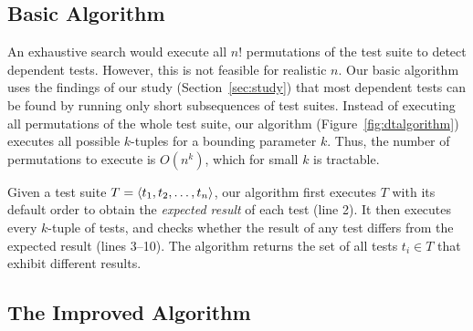 \subsection{Basic Algorithm}
\label{sec:basic}

An exhaustive search would execute all $n!$
permutations of the test suite to detect dependent tests.
However, this is not feasible for realistic $n$.
Our basic algorithm uses the findings of our study
(Section~\ref{sec:study})
that most dependent tests can be found by running only short
subsequences of test suites. 
Instead of executing all permutations of the
whole test suite, our algorithm (Figure~\ref{fig:dtalgorithm})
executes all possible $k$-tuples for a bounding
parameter $k$.
Thus, the number of permutations to execute
is $O(n^k)$, which for small $k$ is tractable. 


Given a test suite $T =  \langle t_1, t_2, \ldots, t_n \rangle $, our algorithm
first executes $T$ with its default order
to obtain the \emph{expected result} of each test (line 2). 
It then executes every $k$-tuple of tests,
and checks whether the result of any test differs
from the expected result (lines 3--10). The algorithm returns the set
of all tests $t_i \in T$
that exhibit different results.





\subsection{The Improved Algorithm}
\label{sec:advalgorithm}

